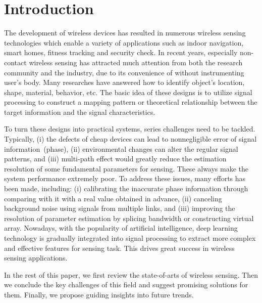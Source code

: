 \section{Introduction}
The development of wireless devices has resulted in numerous wireless sensing technologies which enable a variety of applications such as indoor navigation, smart homes, fitness tracking and security check. In recent years, especially non-contact wireless sensing has attracted much attention from both the research community and the industry, due to its convenience of without instrumenting user's body. Many researches have answered how to identify object's location, shape, material, behavior, etc. The basic idea of these designs is to utilize signal processing to construct a mapping pattern or theoretical relationship between the target information and the signal characteristics.

To turn these designs into practical systems, series challenges need to be tackled. Typically, (i) the defects of cheap devices can lead to nonnegligible error of signal information~(phase), (ii) environmental changes can alter the regular signal patterns, and (iii) multi-path effect would greatly reduce the estimation resolution of some fundamental parameters for sensing. These always make the system performance extremely poor. To address these issues, many efforts has been made, including: (i) calibrating the inaccurate phase information through comparing with it with a real value obtained in advance, (ii) canceling background noise using signals from multiple links, and (iii) improving the resolution of parameter estimation by splicing bandwidth or constructing virtual array. Nowadays, with the popularity of artificial intelligence, deep learning technology is gradually integrated into signal processing to extract more complex and effective features for sensing task. This drives great success in wireless sensing applications.

In the rest of this paper, we first review the state-of-arts of wireless sensing. Then we conclude the key challenges of this field and suggest promising solutions for them. Finally, we propose guiding insights into future trends.
